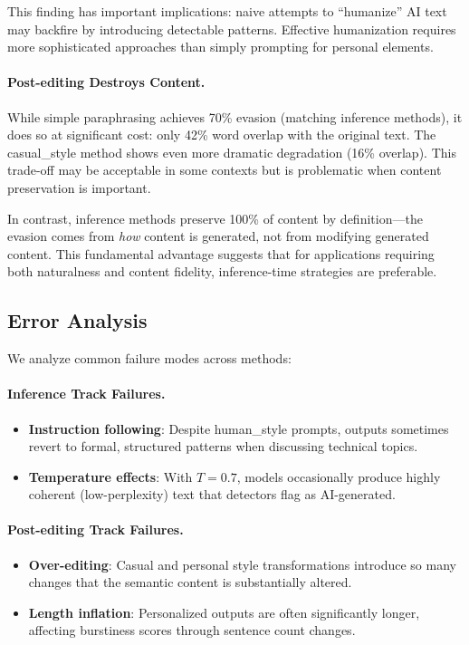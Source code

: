 This finding has important implications: naive attempts to ``humanize'' AI text may backfire by introducing detectable patterns. Effective humanization requires more sophisticated approaches than simply prompting for personal elements.

\paragraph{Post-editing Destroys Content.} While simple paraphrasing achieves 70\% evasion (matching inference methods), it does so at significant cost: only 42\% word overlap with the original text. The casual\_style method shows even more dramatic degradation (16\% overlap). This trade-off may be acceptable in some contexts but is problematic when content preservation is important.

In contrast, inference methods preserve 100\% of content by definition---the evasion comes from \textit{how} content is generated, not from modifying generated content. This fundamental advantage suggests that for applications requiring both naturalness and content fidelity, inference-time strategies are preferable.

\subsection{Error Analysis}

We analyze common failure modes across methods:

\paragraph{Inference Track Failures.}
\begin{itemize}
    \item \textbf{Instruction following}: Despite human\_style prompts, outputs sometimes revert to formal, structured patterns when discussing technical topics.
    \item \textbf{Temperature effects}: With $T=0.7$, models occasionally produce highly coherent (low-perplexity) text that detectors flag as AI-generated.
\end{itemize}

\paragraph{Post-editing Track Failures.}
\begin{itemize}
    \item \textbf{Over-editing}: Casual and personal style transformations introduce so many changes that the semantic content is substantially altered.
    \item \textbf{Length inflation}: Personalized outputs are often significantly longer, affecting burstiness scores through sentence count changes.
\end{itemize}

